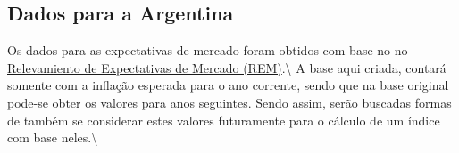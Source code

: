 \documentclass[
]{article}
\begin{document}
\hypertarget{dados-para-a-argentina}{%
\subsection{Dados para a Argentina}\label{dados-para-a-argentina}}

Os dados para as expectativas de mercado foram obtidos com base no no
\href{https://www.bcra.gob.ar/publicacionesestadisticas/relevamiento_expectativas_de_mercado.asp}{Relevamiento
de Expectativas de Mercado (REM)}.\textbackslash{} A base aqui criada,
contará somente com a inflação esperada para o ano corrente, sendo que
na base original pode-se obter os valores para anos seguintes. Sendo
assim, serão buscadas formas de também se considerar estes valores
futuramente para o cálculo de um índice com base neles.\textbackslash{}
\end{document}
